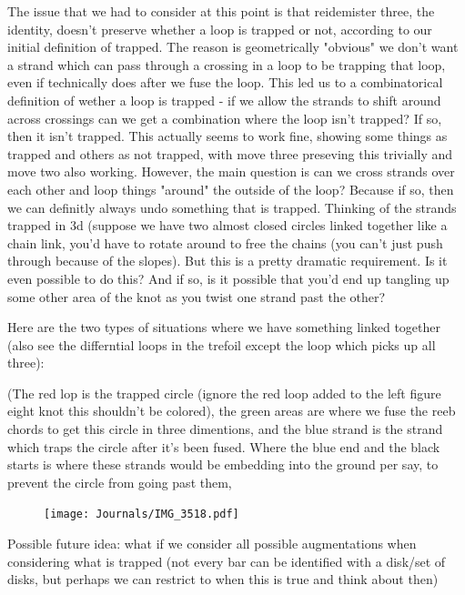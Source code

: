 \documentclass[11pt,oneside]{amsart}
\begin{document}
The issue that we had to consider at this point is that reidemister three, the identity, doesn't preserve whether a loop is trapped or not, according to our initial definition of trapped. The reason is geometrically "obvious" we don't want a strand which can pass through a crossing in a loop to be trapping that loop, even if technically does after we fuse the loop. This led us to a combinatorical definition of wether a loop is trapped - if we allow the strands to shift around across crossings can we get a combination where the loop isn't trapped? If so, then it isn't trapped. This actually seems to work fine, showing some things as trapped and others as not trapped, with move three preseving this trivially and move two also working. However, the main question is can we cross strands over each other and loop things "around" the outside of the loop? Because if so, then we can definitly always undo something that is trapped. Thinking of the strands trapped in 3d  (suppose we have two almost closed circles linked together like a chain link, you'd have to rotate around to free the chains (you can't just push through because of the slopes). But this is a pretty dramatic requirement. Is it even possible to do this? And if so, is it possible that you'd end up tangling up some other area of the knot as you twist one strand past the other?

Here are the two types of situations where we have something linked together (also see the differntial loops in the trefoil except the loop which picks up all three): 

(The red lop is the trapped circle (ignore the red loop added to the left figure eight knot this shouldn't be colored), the green areas are where we fuse the reeb chords to get this circle in three dimentions, and the blue strand is the strand which traps the circle after it's been fused. Where the blue end and the black starts is where these strands would be embedding into the ground per say, to prevent the circle from going past them, 

\begin{figure}
    \centering
    \texttt{[image: Journals/IMG\_3518.pdf]}

   
    \label{fig:mathematica}
\end{figure}






Possible future idea: what if we consider all possible augmentations when considering what is trapped (not every bar can be identified with a disk/set of disks, but perhaps we can restrict to when this is true and think about then)
\end{document}
